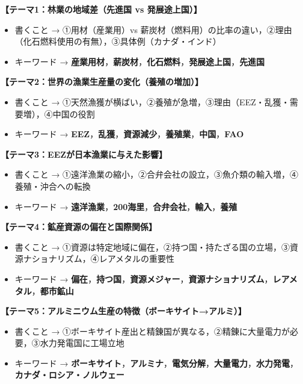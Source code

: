 \documentclass[a4paper,11pt]{article}
\newcommand{\key}[1]{\textbf{\textcolor{mainblue}{#1}}}
\begin{document}
\begin{tcolorbox}[warnbox, title={■ 記述テーマ別ポイント一覧}]

\textbf{【テーマ1：林業の地域差（先進国 vs 発展途上国）】}
\begin{itemize}[leftmargin=1.5em]
  \item 書くこと → ①用材（産業用）vs 薪炭材（燃料用）の比率の違い，②理由（化石燃料使用の有無），③具体例（カナダ・インド）
  \item キーワード → \key{産業用材}，\key{薪炭材}，\key{化石燃料}，\key{発展途上国}，\key{先進国}
\end{itemize}

\medskip
\textbf{【テーマ2：世界の漁業生産量の変化（養殖の増加）】}
\begin{itemize}[leftmargin=1.5em]
  \item 書くこと → ①天然漁獲が横ばい，②養殖が急増，③理由（EEZ・乱獲・需要増），④中国の役割
  \item キーワード → \key{EEZ}，\key{乱獲}，\key{資源減少}，\key{養殖業}，\key{中国}，\key{FAO}
\end{itemize}

\medskip
\textbf{【テーマ3：EEZが日本漁業に与えた影響】}
\begin{itemize}[leftmargin=1.5em]
  \item 書くこと → ①遠洋漁業の縮小，②合弁会社の設立，③魚介類の輸入増，④養殖・沖合への転換
  \item キーワード → \key{遠洋漁業}，\key{200海里}，\key{合弁会社}，\key{輸入}，\key{養殖}
\end{itemize}

\medskip
\textbf{【テーマ4：鉱産資源の偏在と国際関係】}
\begin{itemize}[leftmargin=1.5em]
  \item 書くこと → ①資源は特定地域に偏在，②持つ国・持たざる国の立場，③資源ナショナリズム，④レアメタルの重要性
  \item キーワード → \key{偏在}，\key{持つ国}，\key{資源メジャー}，\key{資源ナショナリズム}，\key{レアメタル}，\key{都市鉱山}
\end{itemize}

\medskip
\textbf{【テーマ5：アルミニウム生産の特徴（ボーキサイト→アルミ）】}
\begin{itemize}[leftmargin=1.5em]
  \item 書くこと → ①ボーキサイト産出と精錬国が異なる，②精錬に大量電力が必要，③水力発電国に工場立地
  \item キーワード → \key{ボーキサイト}，\key{アルミナ}，\key{電気分解}，\key{大量電力}，\key{水力発電}，\key{カナダ・ロシア・ノルウェー}
\end{itemize}


\end{tcolorbox}
\end{document}
